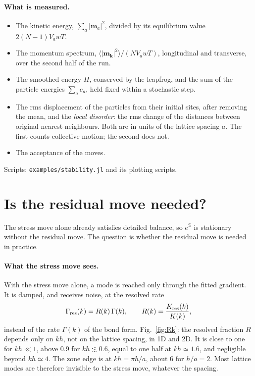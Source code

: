\documentclass[11pt,aps,preprint,nofootinbib,superscriptaddress,tightenlines]{revtex4-2}
\def\st{\begin{equation}}
\def\stp{\end{equation}}
\def\Fig#1{Fig.~\ref{#1}}
\newcommand{\avg}[1]{\langle #1\rangle}
\let\oldparagraph\paragraph
\renewcommand{\paragraph}{\par\bigskip\oldparagraph}
\begin{document}
\paragraph{What is measured.}
\begin{itemize}
\item The kinetic energy, $\sum_a|\bm m_a|^2$, divided by its equilibrium value
  $2(N-1)V_awT$.
\item The momentum spectrum, $\avg{|\bm m_{\bm k}|^2}/(NV_awT)$, longitudinal and
  transverse, over the second half of the run.
\item The smoothed energy $H$, conserved by the leapfrog, and the sum of the
  particle energies $\sum_ae_a$, held fixed within a stochastic step.
\item The rms displacement of the particles from their initial sites, after
  removing the mean, and the \emph{local disorder}: the rms change of the
  distances between original nearest neighbours.  Both are in units of the
  lattice spacing $a$.  The first counts collective motion; the second does not.
\item The acceptance of the moves.
\end{itemize}
Scripts: \texttt{examples/stability.jl} and its plotting scripts.

\section{Is the residual move needed?}
\label{sec:needresid}

The stress move alone already satisfies detailed balance, so $e^{\mathbb S}$ is
stationary without the residual move.  The question is whether the residual
move is needed in practice.

\paragraph{What the stress move sees.}  With the stress move alone, a mode is
reached only through the fitted gradient.  It is damped, and receives noise, at
the resolved rate
\st
\Gamma_{\rm res}(k)=R(k)\,\Gamma(k),\qquad R(k)=\frac{K_{\rm res}(k)}{K(k)} ,
\stp
instead of the rate $\Gamma(k)$ of the bond form.  \Fig{fig:Rk}: the resolved
fraction $R$ depends only on $kh$, not on the lattice spacing, in 1D and 2D.  It
is close to one for $kh\ll1$, above $0.9$ for $kh\lesssim0.6$, equal to one half at
$kh\simeq1.6$, and negligible beyond $kh\simeq4$.  The zone edge is at $kh=\pi h/a$,
about $6$ for $h/a=2$.  Most lattice modes are therefore invisible to the stress
move, whatever the spacing.
\end{document}
